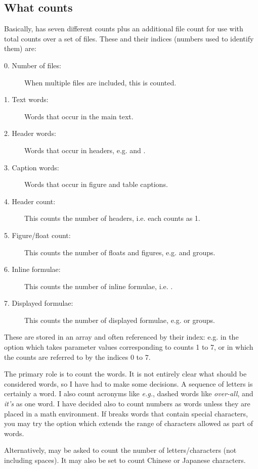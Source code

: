 \documentclass{article}
\begin{document}
\subsection{What \TeXcount{} counts}

Basically, \TeXcount{} has seven different counts plus an additional file count for use with total counts over a set of files. These and their indices (numbers used to identify them) are:
\begin{description}
\item[0. Number of files:] When multiple files are included, this is counted.
\item[1. Text words:] Words that occur in the main text.
\item[2. Header words:] Words that occur in headers, e.g.  and .
\item[3. Caption words:] Words that occur in figure and table captions.
\item[4. Header count:] This counts the number of headers, i.e. each  counts as 1.
\item[5. Figure/float count:] This counts the number of floats and figures, e.g.  and  groups.
\item[6. Inline formulae:] This counts the number of inline formulae, i.e. \code{\$\ldots\$}.
\item[7. Displayed formulae:] This counts the number of displayed formulae, e.g. \code{\bs{[}\ldots\bs{]}} or  groups.
\end{description}
These are stored in an array and often referenced by their index: e.g. in the option  which takes parameter values corresponding to counts 1 to 7, or  in which the counts are referred to by the indices 0 to 7.

The primary role is to count the words. It is not entirely clear what should be considered words, so I have had to make some decisions. A sequence of letters is certainly a word. I also count acronyms like \textit{e.g.}, dashed words like \textit{over-all}, and \textit{it's} as one word. I have decided also to count numbers as words unless they are placed in a math environment. If \TeXcount{} breaks words that contain special characters, you may try the option  which extends the range of characters allowed as part of words.

Alternatively, \TeXcount{} may be asked to count the number of letters/characters (not including spaces). It may also be set to count Chinese or Japanese characters.
\end{document}
